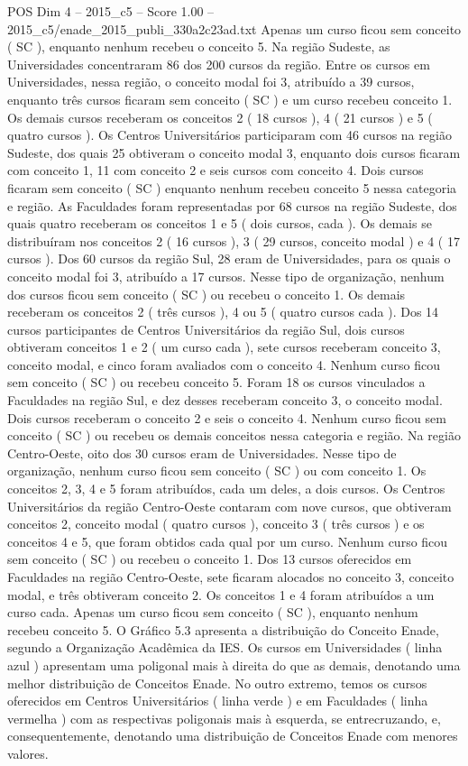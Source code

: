 \begin{textsample}{POS Dim 4 – 2015\_c5 – Score 1.00 – 2015\_c5/enade\_2015\_publi\_330a2c23ad.txt}
Apenas um curso ficou sem conceito ( SC ), enquanto nenhum recebeu o conceito 5.
Na região Sudeste, as Universidades concentraram 86 dos 200 cursos da região.
Entre os cursos em Universidades, nessa região, o conceito modal foi 3, atribuído a 39 cursos, enquanto três cursos ficaram sem conceito ( SC ) e um curso recebeu conceito 1.
Os demais cursos receberam os conceitos 2 ( 18 cursos ), 4 ( 21 cursos ) e 5 ( quatro cursos ).
Os Centros Universitários participaram com 46 cursos na região Sudeste, dos quais 25 obtiveram o conceito modal 3, enquanto dois cursos ficaram com conceito 1, 11 com conceito 2 e seis cursos com conceito 4.
Dois cursos ficaram sem conceito ( SC ) enquanto nenhum recebeu conceito 5 nessa categoria e região.
As Faculdades foram representadas por 68 cursos na região Sudeste, dos quais quatro receberam os conceitos 1 e 5 ( dois cursos, cada ).
Os demais se distribuíram nos conceitos 2 ( 16 cursos ), 3 ( 29 cursos, conceito modal ) e 4 ( 17 cursos ).
Dos 60 cursos da região Sul, 28 eram de Universidades, para os quais o conceito modal foi 3, atribuído a 17 cursos.
Nesse tipo de organização, nenhum dos cursos ficou sem conceito ( SC ) ou recebeu o conceito 1.
Os demais receberam os conceitos 2 ( três cursos ), 4 ou 5 ( quatro cursos cada ).
Dos 14 cursos participantes de Centros Universitários da região Sul, dois cursos obtiveram conceitos 1 e 2 ( um curso cada ), sete cursos receberam conceito 3, conceito modal, e cinco foram avaliados com o conceito 4.
Nenhum curso ficou sem conceito ( SC ) ou recebeu conceito 5.
Foram 18 os cursos vinculados a Faculdades na região Sul, e dez desses receberam conceito 3, o conceito modal.
Dois cursos receberam o conceito 2 e seis o conceito 4.
Nenhum curso ficou sem conceito ( SC ) ou recebeu os demais conceitos nessa categoria e região.
Na região Centro-Oeste, oito dos 30 cursos eram de Universidades.
Nesse tipo de organização, nenhum curso ficou sem conceito ( SC ) ou com conceito 1.
Os conceitos 2, 3, 4 e 5 foram atribuídos, cada um deles, a dois cursos.
Os Centros Universitários da região Centro-Oeste contaram com nove cursos, que obtiveram conceitos 2, conceito modal ( quatro cursos ), conceito 3 ( três cursos ) e os conceitos 4 e 5, que foram obtidos cada qual por um curso.
Nenhum curso ficou sem conceito ( SC ) ou recebeu o conceito 1.
Dos 13 cursos oferecidos em Faculdades na região Centro-Oeste, sete ficaram alocados no conceito 3, conceito modal, e três obtiveram conceito 2.
Os conceitos 1 e 4 foram atribuídos a um curso cada.
Apenas um curso ficou sem conceito ( SC ), enquanto nenhum recebeu conceito 5.
O Gráfico 5.3 apresenta a distribuição do Conceito Enade, segundo a Organização Acadêmica da IES.
Os cursos em Universidades ( linha azul ) apresentam uma poligonal mais à direita do que as demais, denotando uma melhor distribuição de Conceitos Enade.
No outro extremo, temos os cursos oferecidos em Centros Universitários ( linha verde ) e em Faculdades ( linha vermelha ) com as respectivas poligonais mais à esquerda, se entrecruzando, e, consequentemente, denotando uma distribuição de Conceitos Enade com menores valores.

\end{textsample}
